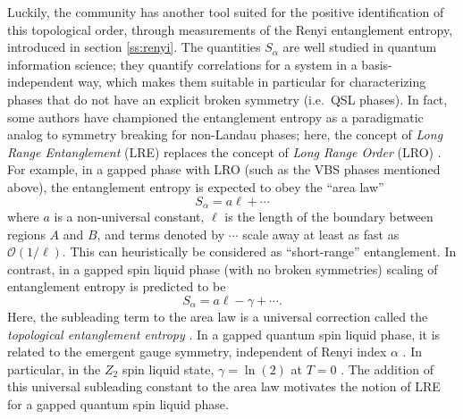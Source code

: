 \documentclass[range]{ar2e}
\begin{document}
Luckily, the community has another tool suited for the positive identification of this topological order, through measurements of the Renyi entanglement entropy, introduced in section \ref{ss:renyi}.  The quantities $S_{\alpha}$ are well studied in quantum information science; they quantify correlations for a system in a basis-independent way, which makes them suitable in particular for characterizing phases that do not have an explicit broken symmetry (i.e.~QSL phases).  In fact, some authors have championed the entanglement entropy as a paradigmatic analog to symmetry breaking for non-Landau phases; here, the concept of {\it Long Range Entanglement} (LRE) replaces the concept of {\it Long Range Order} (LRO) \cite{Wenbook}.  For example, in a gapped phase with LRO (such as the VBS phases mentioned above),
the entanglement entropy is expected to obey the ``area law''
\begin{equation} 
S_{\alpha} = a\ell + \cdots \label{arealaw}
\end{equation}
where $a$ is a non-universal constant, $\ell$ is the length of the boundary between regions $A$ and $B$, and terms denoted by $\cdots$ scale away at least as fast as $\mathcal{O} (1/\ell)$.  This can heuristically be considered as ``short-range'' entanglement.  In contrast, in a gapped spin liquid phase (with no broken symmetries)
scaling of entanglement entropy is predicted to be
\begin{equation}
S_{\alpha} = a \ell - \gamma + \cdots \label{areaL}.
\end{equation}
 Here, the subleading term to the area law is a universal correction called the {\it topological entanglement entropy} \cite{Alioscia1,Alioscia2,LW,KP}.  In a gapped quantum spin liquid phase, it is related to the emergent gauge symmetry, independent of Renyi index $\alpha$ \cite{Flammia}.  In particular, in the $Z_2$ spin liquid state, $\gamma =  \ln(2)$ at $T=0$ \cite{LW}.   The addition of this universal subleading constant to the area law motivates the notion of LRE for a gapped quantum spin liquid phase.
\end{document}
